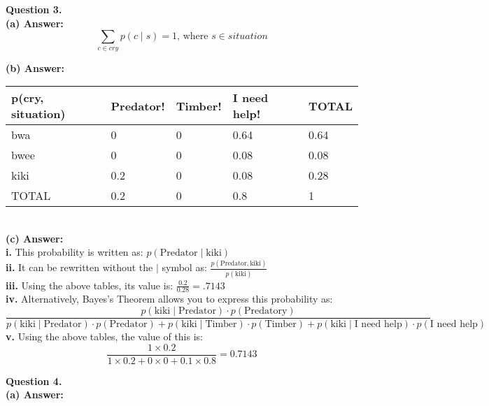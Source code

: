 \documentclass{article}
\begin{document}
\noindent
\textbf{Question 3.}\\
\textbf{(a) Answer:}\\
$$\sum_{c \in cry}p(c \mid s) = 1\text{, where } s \in situation$$

\noindent
\textbf{(b) Answer:}\\
\begin{tabular}{ |p{2.5cm}||p{2.5cm}|p{2.5cm}|p{2.5cm}||p{2.5cm}|  }
 \hline
 p(cry, situation) & Predator! & Timber! & I need help! & TOTAL\\
 \hline
 \hline
 bwa   & 0   & 0 & 0.64 & 0.64\\
 \hline
 bwee  & 0   & 0 & 0.08 & 0.08\\
 \hline
 kiki  & 0.2 & 0 & 0.08 & 0.28\\
 \hline
 \hline
 TOTAL & 0.2 & 0 & 0.8 & 1\\
 \hline
\end{tabular}
\\

\noindent
\textbf{(c) Answer:}\\
\textbf{i.} This probability is written as: $p(\text{Predator} \mid \text{kiki})$\\
\textbf{ii.} It can be rewritten without the $\mid$ symbol as: $\frac{p(\text{Predator}, \text{kiki})}{p(\text{kiki})}$\\
\textbf{iii.} Using the above tables, its value is: $\frac{0.2}{0.28} = .7143$\\
\textbf{iv.} Alternatively, Bayes's Theorem allows you to express this probability as:\\
$$\frac{p(\text{kiki} \mid \text{Predator}) \cdot p(\text{Predatory})}{p(\text{kiki} \mid \text{Predator}) \cdot p(\text{Predator}) + p(\text{kiki} \mid \text{Timber}) \cdot p(\text{Timber}) + p(\text{kiki} \mid \text{I need help}) \cdot p(\text{I need help})}$$
\textbf{v.} Using the above tables, the value of this is:\\
$$\frac{1 \times 0.2}{1 \times 0.2 + 0 \times 0 + 0.1 \times 0.8} = 0.7143$$

\noindent
\textbf{Question 4.}\\
\textbf{(a) Answer:}\\
\end{document}
